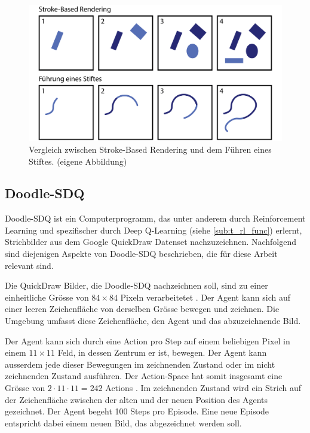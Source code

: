 \begin{figure}[!ht]
   \centering
   \includegraphics[width=\textwidth-2cm]{images/theorie/stroke-v-stift.png}
   \caption{Vergleich zwischen Stroke-Based Rendering und dem Führen eines Stiftes. (eigene Abbildung)}\label{fig:stroke-v-stift}
\end{figure}
 
\subsection{Doodle-SDQ}\label{sub:t_ver_dood} Doodle-SDQ ist ein
Computerprogramm, das unter anderem durch Reinforcement Learning und
spezifischer durch Deep Q-Learning (siehe \ref{sub:t_rl_func}) erlernt,
Strichbilder aus dem Google QuickDraw Datenset \cite{noauthor_quick_2022}
nachzuzeichnen. Nachfolgend sind diejenigen Aspekte von Doodle-SDQ beschrieben,
die für diese Arbeit relevant sind.
 
Die QuickDraw Bilder, die Doodle-SDQ nachzeichnen soll, sind zu einer
einheitliche Grösse von $84\times84$ Pixeln verarbeitetet \cite[S.
7]{zhou_learning_2018}. Der Agent kann sich auf einer leeren Zeichenfläche von
derselben Grösse bewegen und zeichnen. Die Umgebung umfasst diese
Zeichenfläche, den Agent und das abzuzeichnende Bild.
 
Der Agent kann sich durch eine Action pro Step auf einem beliebigen Pixel in
einem $11\times11$ Feld, in dessen Zentrum er ist, bewegen. Der Agent kann
ausserdem jede dieser Bewegungen im zeichnenden Zustand oder im nicht
zeichnenden Zustand ausführen. Der Action-Space hat somit insgesamt eine Grösse
von $2\cdot11\cdot11 = 242$ Actions \cite[S. 5]{zhou_learning_2018}. Im
zeichnenden Zustand wird ein Strich auf der Zeichenfläche zwischen der alten und
der neuen Position des Agents gezeichnet. Der Agent begeht 100 Steps pro
Episode. Eine neue Episode entspricht dabei einem neuen Bild, das abgezeichnet
werden soll.
 
